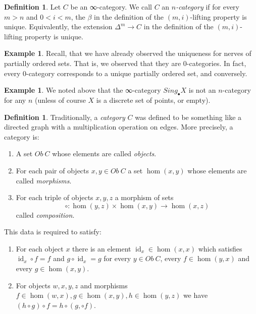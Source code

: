 \documentclass[a4paper]{amsart}
\numberwithin{figure}{section}
\theoremstyle{theorem}
\theoremstyle{definition}
\newtheorem{defi}[thm]{Definition}
\newtheorem{exam}[thm]{Example}
\DeclareMathOperator{\id}{id}
\begin{document}
\begin{mdframed}
\begin{defi}
Let $C$ be an ∞-category. We call $C$ an \emph{$n$-category} if for every $m > n$ and $0 < i < m$, the $\beta$ in the definition of the $(m, i)$-lifting property is unique. Equivalently, the extension $\Delta^m \to C$ in the definition of the $(m, i)$-lifting property is unique.
\end{defi}
\end{mdframed}

\begin{exam}
Recall, that we have already observed the uniqueness for nerves of partially ordered sets. That is, we observed that they are 0-categories. In fact, every 0-category corresponds to a unique partially ordered set, and conversely.
\end{exam}

\begin{exam}
We noted above that the ∞-category $Sing_\bullet X$ is not an $n$-category for any $n$ (unless of course $X$ is a discrete set of points, or empty).
\end{exam}

\begin{defi}
Traditionally, a \emph{category} $C$ was defined to be something like a directed graph with a multiplication operation on edges. More precisely, a category is:
\begin{enumerate}
 \item A set $Ob\ C$ whose elements are called \emph{objects}.
 \item For each pair of objects $x, y \in Ob\ C$ a set $\hom(x, y)$ whose elements are called \emph{morphisms}.
 \item For each triple of objects $x, y, z$ a morphism of sets
\[ \circ: \hom(y, z) \times \hom(x, y) \to \hom(x, z) \]
called \emph{composition}.
\end{enumerate}
This data is required to satisfy:
\begin{enumerate}
 \item For each object $x$ there is an element $\id_x \in \hom(x, x)$ which satisfies $\id_x \circ f = f$ and $g \circ \id_x = g$ for every $y \in Ob\ C$, every $f \in \hom(y, x)$ and every $g \in \hom(x, y)$.
 \item For objects $w, x, y, z$ and morphisms $f \in \hom(w, x), g \in \hom(x, y), h \in \hom(y, z)$ we have $(h \circ g) \circ f = h \circ (g, \circ f)$. 
\end{enumerate}
\end{defi}
\end{document}
